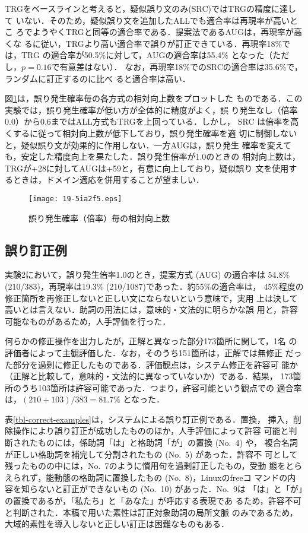 \documentclass[japanese]{jnlp_1.4}
\begin{document}
TRGをベースラインと考えると，疑似誤り文のみ(SRC)ではTRGの精度に達して
いない．そのため，疑似誤り文を追加したALLでも適合率は再現率が高いとこ
ろでようやくTRGと同等の適合率である．提案法であるAUGは，再現率が高くな
るに従い，TRGより高い適合率で誤りが訂正できている．再現率18\%では，TRG 
の適合率が50.5\%に対して，AUGの適合率は55.4\% 
となった（ただし，$p = 0.16$で有意差はない）．
なお，再現率18\%でのSRCの適合率は35.6\%で，ランダムに訂正するのに比べ
ると適合率は高い．

図\ref{fig-graph2}は，誤り発生確率毎の各方式の相対向上数をプロットした
ものである．この実験では，誤り発生確率が低い方が全体的に精度がよく，誤
り発生なし（倍率0.0）から0.6まではALL方式もTRGを上回っている．しかし，
SRC は倍率を高くするに従って相対向上数が低下しており，誤り発生確率を適
切に制御しないと，疑似誤り文が効果的に作用しない．一方AUGは，誤り発生
確率を変えても，安定した精度向上を果たした．誤り発生倍率が1.0のときの
相対向上数は，TRGが+28に対してAUGは+59と，有意に向上しており，疑似誤り
文を使用するときは，ドメイン適応を併用することが望ましい．

\begin{figure}[t]
\begin{center}
\texttt{[image: 19-5ia2f5.eps]}
\end{center}
\caption{誤り発生確率（倍率）毎の相対向上数}
\label{fig-graph2}
\end{figure}



\subsection{誤り訂正例}

実験2において，誤り発生倍率1.0のとき，提案方式 (AUG) の適合率は
54.8\% (210/383)，再現率は19.3\% (210/1087)であった．約55\%の適合率は，
45\%程度の修正箇所を再修正しないと正しい文にならないという意味で，実用
上は決して高いとは言えない．助詞の用法には，意味的・文法的に明らかな誤
用と，許容可能なものがあるため，人手評価を行った．

何らかの修正操作を出力したが，正解と異なった部分173箇所に関して，1名
の評価者によって主観評価した．なお，そのうち151箇所は，正解では無修正
だった部分を過剰に修正したものである．評価観点は，システム修正を許容可
能か（正解と比較して，意味的・文法的に異なっていないか）である．結果，
173箇所のうち103箇所は許容可能であった．つまり，許容可能という観点での
適合率は，$(210+103)/383=81.7\%$ となった．

表\ref{tbl-correct-examples}は，システムによる誤り訂正例である．置換，
挿入，削除操作により誤り訂正が成功したもののほか，人手評価によって許容
可能と判断されたものには，係助詞「は」と格助詞「が」の置換 (No.~4) や，
複合名詞が正しい格助詞を補完して分割されたもの (No.~5) があった．許容不
可として残ったものの中には，No.~7のように慣用句を過剰訂正したもの，受動
態をとらえられず，能動態の格助詞に置換したもの (No.~8)，Linuxのfreeコ
マンドの内容を知らないと訂正ができないもの (No.~10) があった．No.~9は
「は」と「が」の置換であるが，「私たち」と「あなた」が呼応する表現であ
るため，許容不可と判断された．本稿で用いた素性は訂正対象助詞の局所文脈
のみであるため，大域的素性を導入しないと正しい訂正は困難なものもある．
\end{document}
